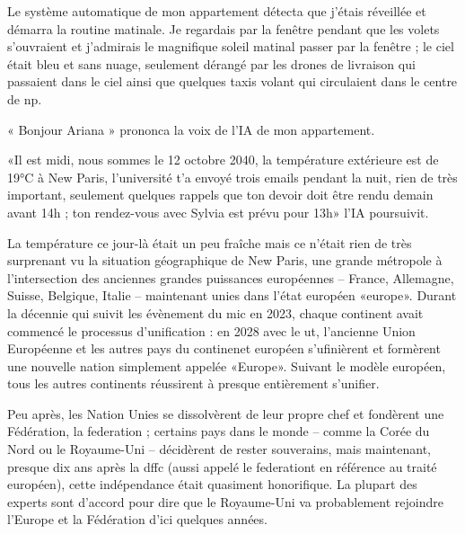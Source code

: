 \documentclass[12pt,hidelinks,a4paper]{book}
\begin{document}
\bigskip
Le système automatique de mon appartement détecta que j'étais réveillée
et démarra la routine matinale. Je regardais par la fenêtre pendant
que les volets s'ouvraient et j'admirais le magnifique soleil matinal
passer par la fenêtre ; le ciel était bleu et sans nuage, seulement
dérangé par les drones de livraison qui passaient dans le ciel ainsi
que quelques taxis volant qui circulaient dans le centre de \gls{np}. \par

\bigskip
« Bonjour Ariana » prononca la voix de l'IA de mon appartement.\par

\bigskip
«Il est midi, nous sommes le 12 octobre 2040, la température extérieure
est de 19°C à New Paris, l'université t'a envoyé trois emails pendant
la nuit, rien de très important, seulement quelques rappels que ton
devoir doit être rendu demain avant 14h ; ton rendez-vous avec Sylvia
est prévu pour 13h» l'IA poursuivit.\par

\bigskip

La température ce jour-là était un peu fraîche mais ce n'était rien
de très surprenant vu la situation géographique de New Paris, une
grande métropole à l'intersection des anciennes grandes puissances
européennes -- France, Allemagne, Suisse, Belgique, Italie -- maintenant
unies dans l'état européen «\gls{europe}». Durant la décennie
qui suivit les évènement du \gls{mic} en 2023, chaque continent
avait commencé le processus d'unification : en 2028 avec le \gls{ut},
l'ancienne Union Européenne et les autres pays du continenet européen
s'ufinièrent et formèrent une nouvelle nation simplement appelée «Europe».
Suivant le modèle européen, tous les autres continents réussirent
à presque entièrement s'unifier.\par

\bigskip

Peu après, les Nation Unies se dissolvèrent de leur propre chef et
fondèrent une Fédération, la \gls{federation} ; certains pays dans
le monde -- comme la Corée du Nord ou le Royaume-Uni -- décidèrent
de rester souverains, mais maintenant, presque dix ans après la \gls{dffc}
(aussi appelé le \gls{federationt} en référence au traité européen),
cette indépendance était quasiment honorifique. La plupart des experts
sont d'accord pour dire que le Royaume-Uni va probablement rejoindre
l'Europe et la Fédération d'ici quelques années.\par

\bigskip
\end{document}
